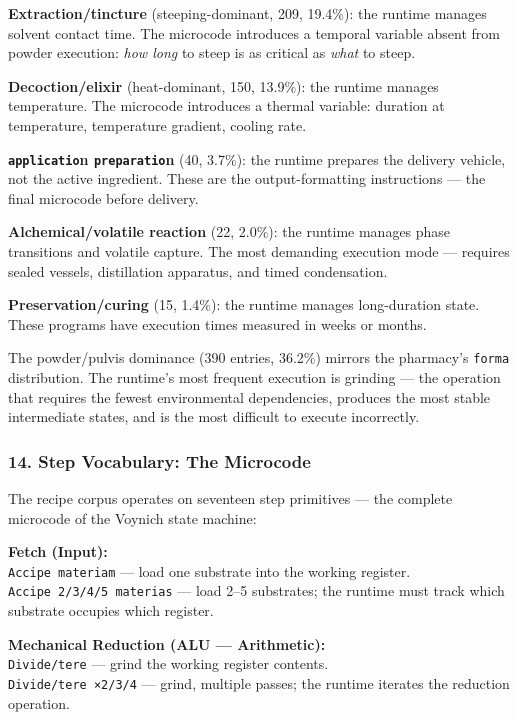 \documentclass[12pt,a4paper]{article}
\begin{document}
\textbf{Extraction/tincture} (steeping-dominant, 209, 19.4\%): the
runtime manages solvent contact time. The microcode introduces a
temporal variable absent from powder execution: \emph{how long} to steep
is as critical as \emph{what} to steep.

\textbf{Decoction/elixir} (heat-dominant, 150, 13.9\%): the runtime
manages temperature. The microcode introduces a thermal variable:
duration at temperature, temperature gradient, cooling rate.

\textbf{\texttt{applicatio}n \texttt{preparatio}n} (40, 3.7\%): the
runtime prepares the delivery vehicle, not the active ingredient. These
are the output-formatting instructions --- the final microcode before
delivery.

\textbf{Alchemical/volatile reaction} (22, 2.0\%): the runtime manages
phase transitions and volatile capture. The most demanding execution
mode --- requires sealed vessels, distillation apparatus, and timed
condensation.

\textbf{Preservation/curing} (15, 1.4\%): the runtime manages
long-duration state. These programs have execution times measured in
weeks or months.

The powder/pulvis dominance (390 entries, 36.2\%) mirrors the pharmacy's
\texttt{forma} distribution. The runtime's most frequent execution is
grinding --- the operation that requires the fewest environmental
dependencies, produces the most stable intermediate states, and is the
most difficult to execute incorrectly.

\hypertarget{step-vocabulary-the-microcode}{%
\subsubsection{14. Step Vocabulary: The
Microcode}\label{step-vocabulary-the-microcode}}

The recipe corpus operates on seventeen step primitives --- the complete
microcode of the Voynich state machine:

\textbf{Fetch (Input):}\\
\texttt{Accipe\ materiam} --- load one substrate into the working
register.\\
\texttt{Accipe\ 2/3/4/5\ materias} --- load 2--5 substrates; the runtime
must track which substrate occupies which register.

\textbf{Mechanical Reduction (ALU --- Arithmetic):}\\
\texttt{Divide/tere} --- grind the working register contents.\\
\texttt{Divide/tere\ ×2/3/4} --- grind, multiple passes; the runtime
iterates the reduction operation.
\end{document}
